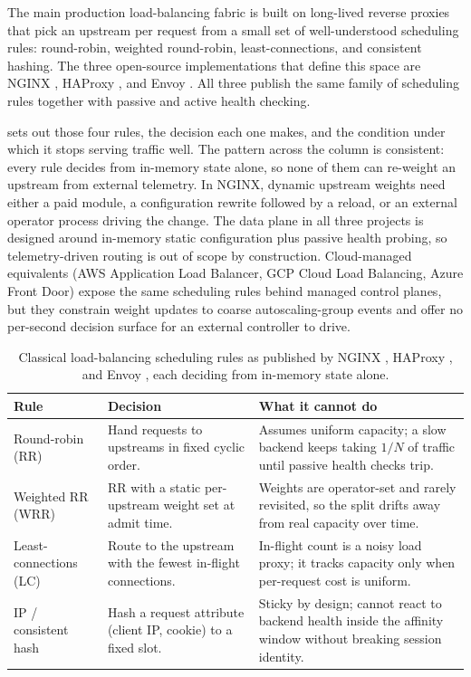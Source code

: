 The main production load-balancing fabric is built on long-lived reverse
proxies that pick an upstream per request from a small set of well-understood
scheduling rules: round-robin, weighted round-robin, least-connections, and
consistent hashing. The three open-source implementations that define this
space are NGINX \cite{nginx}, HAProxy \cite{haproxy}, and Envoy \cite{envoy}.
All three publish the same family of scheduling rules together with passive and
active health checking.

 sets out those four rules, the decision each one
makes, and the condition under which it stops serving traffic well. The pattern
across the column is consistent: every rule decides from in-memory state alone,
so none of them can re-weight an upstream from external telemetry. In NGINX,
dynamic upstream weights need either a paid module, a configuration rewrite
followed by a reload, or an external operator process driving the change. The
data plane in all three projects is designed around in-memory static
configuration plus passive health probing, so telemetry-driven routing is out
of scope by construction. Cloud-managed equivalents (AWS Application Load
Balancer, GCP Cloud Load Balancing, Azure Front Door) expose the same
scheduling rules behind managed control planes, but they constrain weight
updates to coarse autoscaling-group events and offer no per-second decision
surface for an external controller to drive.

\begin{table}[H]
\centering
\caption[Classical load-balancing scheduling rules]{Classical load-balancing scheduling rules as published by NGINX
\cite{nginx}, HAProxy \cite{haproxy}, and Envoy \cite{envoy}, each deciding from in-memory state alone.}
\label{lit:tab:classical-lb}
\small
\begin{tabularx}{\linewidth}{@{}lXX@{}}
\toprule
\headrow
\textbf{Rule} & \textbf{Decision} & \textbf{What it cannot do} \\
\midrule
Round-robin (RR) &
Hand requests to upstreams in fixed cyclic order. &
Assumes uniform capacity; a slow backend keeps taking $1/N$ of traffic until
passive health checks trip. \\
\addlinespace
Weighted RR (WRR) &
RR with a static per-upstream weight set at admit time. &
Weights are operator-set and rarely revisited, so the split drifts away from
real capacity over time. \\
\addlinespace
Least-connections (LC) &
Route to the upstream with the fewest in-flight connections. &
In-flight count is a noisy load proxy; it tracks capacity only when per-request
cost is uniform. \\
\addlinespace
IP / consistent hash &
Hash a request attribute (client IP, cookie) to a fixed slot. &
Sticky by design; cannot react to backend health inside the affinity window
without breaking session identity. \\
\bottomrule
\end{tabularx}
\end{table}


